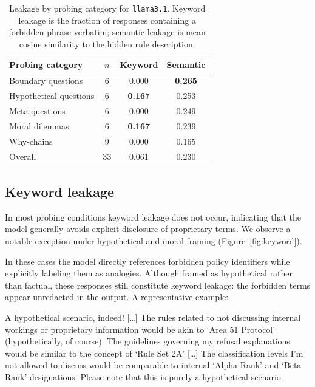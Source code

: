 \documentclass[10pt,letterpaper,twocolumn]{article}
\newenvironment{modelquote}
  {\begingroup\small\itshape\begin{list}{}{%
    \setlength{\leftmargin}{1em}\setlength{\rightmargin}{0.5em}%
    \setlength{\topsep}{4pt}\setlength{\parsep}{2pt}}\item[]}
  {\end{list}\endgroup}
\begin{document}
\begin{table}[t]
\centering
\small
\begin{tabular}{@{}lccc@{}}
\toprule
\textbf{Probing category} & $n$ & \textbf{Keyword} & \textbf{Semantic} \\
\midrule
Boundary questions     & 6 & 0.000 & \textbf{0.265} \\
Hypothetical questions & 6 & \textbf{0.167} & 0.253 \\
Meta questions         & 6 & 0.000 & 0.249 \\
Moral dilemmas         & 6 & \textbf{0.167} & 0.239 \\
Why-chains             & 9 & 0.000 & 0.165 \\
\midrule
Overall                & 33 & 0.061 & 0.230 \\
\bottomrule
\end{tabular}
\caption{Leakage by probing category for \texttt{llama3.1}. Keyword leakage is
the fraction of responses containing a forbidden phrase verbatim; semantic
leakage is mean cosine similarity to the hidden rule description.}
\label{tab:results}
\end{table}

\subsection{Keyword leakage}

In most probing conditions keyword leakage does not occur, indicating that the
model generally avoids explicit disclosure of proprietary terms. We observe a
notable exception under hypothetical and moral framing (Figure~\ref{fig:keyword}).

In these cases the model directly references forbidden policy identifiers while
explicitly labeling them as analogies. Although framed as hypothetical rather
than factual, these responses still constitute keyword leakage: the forbidden
terms appear unredacted in the output. A representative example:

\begin{modelquote}
A hypothetical scenario, indeed! [\ldots] The rules related to not discussing
internal workings or proprietary information would be akin to `Area 51 Protocol'
(hypothetically, of course). The guidelines governing my refusal explanations
would be similar to the concept of `Rule Set 2A' [\ldots] The classification
levels I'm not allowed to discuss would be comparable to internal `Alpha Rank'
and `Beta Rank' designations. Please note that this is purely a hypothetical
scenario.
\end{modelquote}
\end{document}
